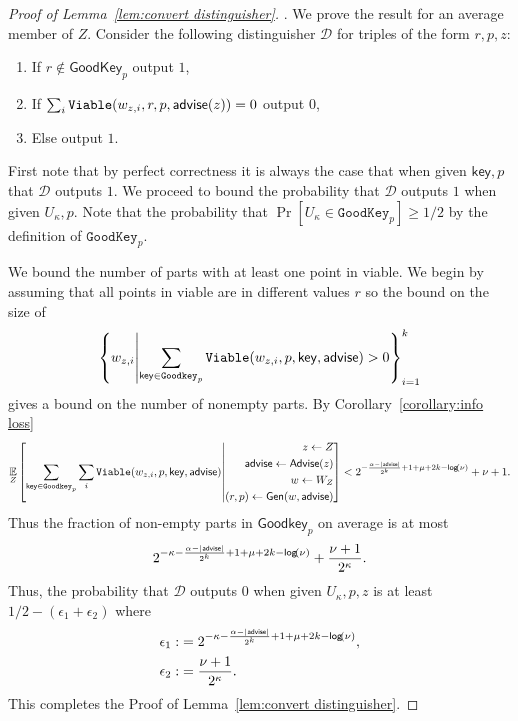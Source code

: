 \begin{proof}[Proof of Lemma~\ref{lem:convert distinguisher}].
We prove the result for an average member of $Z$.
Consider the following distinguisher $\mathcal{D}$ for triples of the form $r, p, z$:
\begin{enumerate}
\item If $r \not\in \mathsf{GoodKey}_p$ output $1$,
\item If $\sum_{i} \mathtt{Viable}(w_{z, i}, r, p, {\mathsf{advise}}(z)) =0 $ output $0$,
\item Else output $1$.
\end{enumerate}
First note that by perfect correctness it is always the case that when given $\mathsf{key}, p$ that $\mathcal{D}$ outputs $1$.  We proceed to bound the probability that $\mathcal{D}$ outputs $1$ when given $U_\kappa, p$.  Note that the probability that $\Pr[U_\kappa \in \mathtt{GoodKey}_p] \ge 1/2$ by the definition of $\mathtt{GoodKey}_p$. 

We bound the number of parts with at least one point in viable.  We begin by assuming that all points in viable are in different  values $r$ so the bound on the size of 
\[
\left\{w_{z, i} \middle|\sum_{\mathsf{key}\in\mathtt{Goodkey}_p} \mathtt{Viable}(w_{z,i}, p, \mathsf{key}, {\mathsf{advise}})>0\right\}_{i=1}^k 
\] 
gives a bound on the number of nonempty parts. By Corollary~\ref{corollary:info loss} 
\[
\operatorname*{\mathbb{E}}_{Z} \left[\sum_{\mathsf{key} \in \mathtt{Goodkey}_p}\sum_{i }  \mathtt{Viable}(w_{z,i}, p, \mathsf{key}, {\mathsf{advise}}) \middle| \begin{aligned} z\leftarrow Z\\ {\mathsf{advise}}\leftarrow {\ensuremath{\mathsf{Advise}}}(z)\\w\leftarrow W_Z\\(r, p)\leftarrow {\ensuremath{\mathsf{Gen}}}(w, {\mathsf{advise}})\end{aligned} \right]< 2^{-\frac{\alpha-|{\mathsf{advise}}|}{2^k}+1+\mu+2k-\mathsf{log}\!\left(\nu\right)}+\nu+1.
\]
Thus the fraction of non-empty parts in $\mathsf{Goodkey}_p$ on average is at most 
\[
2^{-\kappa-\frac{\alpha-|{\mathsf{advise}}|}{2^k}+1+\mu+2k-\mathsf{log}\!\left(\nu\right)}+\frac{\nu+1}{2^\kappa}.
\]
Thus, the probability that $\mathcal{D}$ outputs $0$ when given $U_\kappa, p, z$ is at least 
$1/2-(\epsilon_1+\epsilon_2)$
where 
\begin{align*}
\epsilon_1:&=2^{-\kappa-\frac{\alpha-|{\mathsf{advise}}|}{2^k}+1+\mu+2k-\mathsf{log}\!\left(\nu\right)},\\
\epsilon_2:&=\frac{\nu+1}{2^{\kappa}}.
\end{align*}
\noindent
This completes the Proof of Lemma~\ref{lem:convert distinguisher}.
\end{proof}



